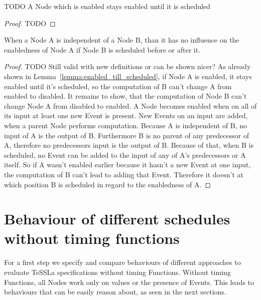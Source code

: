 \begin{lemma}[name = Duration of Enabledness]\label{lemma:enabled_till_scheduled}
  TODO
  A Node which is enabled stays enabled until it is scheduled
\end{lemma}

\begin{proof}
TODO
\end{proof}

\begin{lemma}[name = Influence of independent Nodes]\label{lemma:independence}
  When a Node A is independent of a Node B, than it has no influence on the enabledness of Node A if Node B is scheduled before or after it.
\end{lemma}

\begin{proof}
  TODO Still valid with new definitions or can be shown nicer?
  As already shown in Lemma~\ref{lemma:enabled_till_scheduled}, if Node A is enabled, it stays enabled until it's scheduled, so the computation of B can't change A from enabled to disabled.
  It remains to show, that the computation of Node B can't change Node A from disabled to enabled.
  A Node becomes enabled when on all of its input at least one new Event is present.
  New Events on an input are added, when a parent Node performs computation.
  Because A is independent of B, no input of A is the output of B.
  Furthermore B is no parent of any predecessor of A, therefore no predecessors input is the output of B.
  Because of that, when B is scheduled, no Event can be added to the input of any of A's predecessors or A itself.
  So if A wasn't enabled earlier because it hasn't a new Event at one input, the computation of B can't lead to adding that Event.
  Therefore it doesn't at which position B is scheduled in regard to the enabledness of A.
\end{proof}

\section{Behaviour of different schedules without timing functions}
\label{sec:concepts:behaviour_without_timing}

For a first step we specify and compare behaviours of different approaches to evaluate TeSSLa specifications without timing Functions.
Without timing Functions, all Nodes work only on values or the presence of Events.
This leads to behaviours that can be easily reason about, as seen in the next sections.

